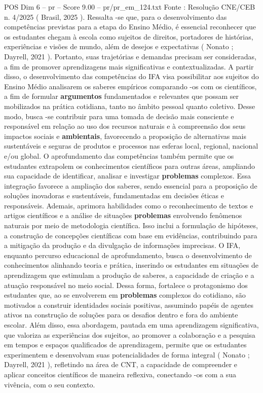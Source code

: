 \begin{textsample}{POS Dim 6 – pr – Score 9.00 – pr/pr\_em\_124.txt}
Fonte : Resolução CNE/CEB n. 4/2025 ( Brasil, 2025 ).
Ressalta -se que, para o desenvolvimento das competências previstas para a etapa do Ensino Médio, é essencial reconhecer que os estudantes chegam à escola como sujeitos de direitos, portadores de histórias, experiências e visões de mundo, além de desejos e expectativas ( Nonato ; Dayrell, 2021 ).
Portanto, suas trajetórias e demandas precisam ser consideradas, a fim de promover aprendizagens mais significativas e contextualizadas.
A partir disso, o desenvolvimento das competências do IFA visa possibilitar aos sujeitos do Ensino Médio analisarem os saberes empíricos comparando -os com os científicos, a fim de formular \textbf{argumentos} fundamentados e relevantes que possam ser mobilizados na prática cotidiana, tanto no âmbito pessoal quanto coletivo.
Desse modo, busca -se contribuir para uma tomada de decisão mais consciente e responsável em relação ao uso dos recursos naturais e à compreensão dos seus impactos sociais e \textbf{ambientais}, favorecendo a proposição de alternativas mais sustentáveis e seguras de produtos e processos nas esferas local, regional, nacional e/ou global.
O aprofundamento das competências também permite que os estudantes extrapolem os conhecimentos científicos para outras áreas, ampliando sua capacidade de identificar, analisar e investigar \textbf{problemas} complexos.
Essa integração favorece a ampliação dos saberes, sendo essencial para a proposição de soluções inovadoras e sustentáveis, fundamentadas em decisões éticas e responsáveis.
Ademais, aprimora habilidades como o reconhecimento de textos e artigos científicos e a análise de situações \textbf{problemas} envolvendo fenômenos naturais por meio de metodologia científica.
Isso inclui a formulação de hipóteses, a construção de concepções científicas com base em evidências, contribuindo para a mitigação da produção e da divulgação de informações imprecisas.
O IFA, enquanto percurso educacional de aprofundamento, busca o desenvolvimento de conhecimentos alinhando teoria e prática, inserindo os estudantes em situações de aprendizagem que estimulam a produção de saberes, a capacidade de criação e a atuação responsável no meio social.
Dessa forma, fortalece o protagonismo dos estudantes que, ao se envolverem em \textbf{problemas} complexos do cotidiano, são motivados a construir identidades sociais positivas, assumindo papéis de agentes ativos na construção de soluções para os desafios dentro e fora do ambiente escolar.
Além disso, essa abordagem, pautada em uma aprendizagem significativa, que valoriza as experiências dos sujeitos, ao promover a colaboração e a pesquisa em tempos e espaços qualificados de aprendizagem, permite que os estudantes experimentem e desenvolvam suas potencialidades de forma integral ( Nonato ; Dayrell, 2021 ), refletindo na área de CNT, a capacidade de compreender e aplicar conceitos científicos de maneira reflexiva, conectando -os com a sua vivência, com o seu contexto.

\end{textsample}
